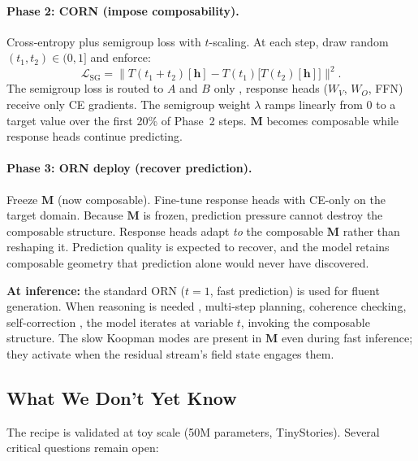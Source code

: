 \documentclass[11pt, a4paper]{article}
\newcommand{\M}{\mathbf{M}}
\theoremstyle{plain}
\theoremstyle{remark}
\begin{document}
\paragraph{Phase 2: CORN (impose composability).}
Cross-entropy plus semigroup loss with $t$-scaling.
At each step, draw random $(t_1, t_2) \in (0, 1]$ and enforce:
\[
  \mathcal{L}_{\mathrm{SG}} = \bigl\| T(t_1 + t_2)[\mathbf{h}] - T(t_1)\bigl[T(t_2)[\mathbf{h}]\bigr] \bigr\|^2.
\]
The semigroup loss is routed to $A$ and $B$ only ,  response heads ($W_V$, $W_O$, FFN) receive only CE gradients.
The semigroup weight $\lambda$ ramps linearly from 0 to a target value over the first 20\% of Phase~2 steps.
$\M$ becomes composable while response heads continue predicting.

\paragraph{Phase 3: ORN deploy (recover prediction).}
Freeze $\M$ (now composable).
Fine-tune response heads with CE-only on the target domain.
Because $\M$ is frozen, prediction pressure cannot destroy the composable structure.
Response heads adapt \emph{to} the composable $\M$ rather than reshaping it.
Prediction quality is expected to recover, and the model retains composable geometry that prediction alone would never have discovered.

\medskip
\noindent\textbf{At inference:} the standard ORN ($t = 1$, fast prediction) is used for fluent generation.
When reasoning is needed ,  multi-step planning, coherence checking, self-correction ,  the model iterates at variable $t$, invoking the composable structure.
The slow Koopman modes are present in $\M$ even during fast inference; they activate when the residual stream's field state engages them.

\subsection{What We Don't Yet Know}

The recipe is validated at toy scale (50M parameters, TinyStories).
Several critical questions remain open:
\end{document}
